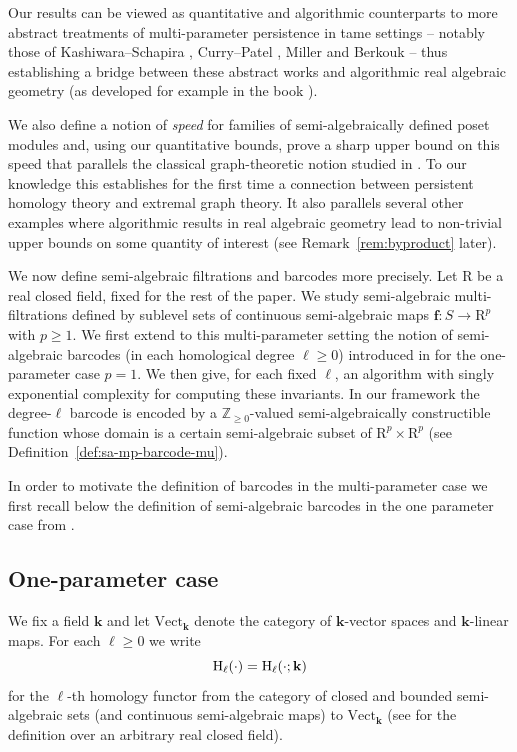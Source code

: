 \documentclass{amsart}[10pts]
\theoremstyle{definition}
\theoremstyle{remark}
\theoremstyle{observation}
\numberwithin{equation}{section}
\newcommand {\R} {\mathrm{R}}
\newcommand {\Z}  {\mathbb{Z}}
\newcommand {\kk}         {\mathbf{k}}
\newcommand{\HH}  {\mbox{\rm H}}
\newcommand{\Vect}{\mathrm{Vect}}
\begin{document}
Our results can be viewed as quantitative and algorithmic counterparts to more abstract treatments of multi-parameter persistence in tame settings --  notably those of Kashiwara--Schapira \cite{KS2018}, Curry--Patel \cite{Curry-Patel}, Miller \cite{Miller2023} and Berkouk \cite{Berkouk2023} -- thus establishing a bridge between these abstract works and algorithmic real algebraic geometry (as developed for example in the book \cite{BPRbook2}). 

\medskip
We also define a notion of \emph{speed} for families of semi-algebraically defined poset modules and, using our quantitative bounds, prove a sharp upper bound on this speed that parallels the classical graph-theoretic notion studied in \cite{Sauermann}. To our knowledge this establishes for the first time a connection between persistent homology theory and extremal graph theory. It also parallels several other examples where algorithmic results in real algebraic geometry lead to non-trivial upper bounds on some quantity of 
interest (see Remark~\ref{rem:byproduct} later).
\medskip

We now define semi-algebraic filtrations and barcodes more precisely.
Let $\R$ be a real closed field, fixed for the rest of the paper. 
We study semi-algebraic multi-filtrations defined by sublevel sets of continuous semi-algebraic maps
$\mathbf f:S\to \R^p$ with $p\ge 1$. 
We first extend to this multi-parameter setting the notion of semi-algebraic barcodes (in each homological degree $\ell\ge 0$) introduced in \cite{Basu-Karisani-2} for the one-parameter case $p=1$. 
We then give, for each fixed $\ell$, an algorithm with singly exponential complexity for computing these invariants. 
In our framework the degree-$\ell$ barcode is encoded by a $\Z_{\ge 0}$-valued semi-algebraically constructible function whose domain is a certain semi-algebraic subset of $\R^p\times \R^p$ (see Definition~\ref{def:sa-mp-barcode-mu}).

\medskip
In order to motivate the definition of barcodes in the multi-parameter case
we first recall below the definition of semi-algebraic barcodes in the one parameter case from \cite{Basu-Karisani-2}.

\subsection{One-parameter case}
\label{subsec:intro:one-parameter}


We fix a field $\kk$ and let $\Vect_{\kk}$ denote the category of $\kk$-vector spaces and $\kk$-linear maps.
For each $\ell\ge 0$ we write
\[
\HH_\ell(\cdot)=\HH_\ell(\cdot;\kk)
\]
for the $\ell$-th homology functor from the category of closed and bounded semi-algebraic sets (and continuous semi-algebraic maps) to $\Vect_{\kk}$
(see \cite[Chapter~6]{BPRbook2} for the definition over an arbitrary real closed field).
\end{document}
